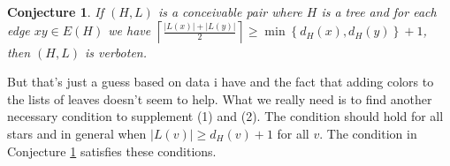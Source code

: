 \documentclass[12pt]{amsart}
\theoremstyle{plain}
\newtheorem{conj}[thm]{Conjecture}
\theoremstyle{definition}
\theoremstyle{remark}
\newcommand{\set}[1]{\left\{ #1 \right\}}
\newcommand{\ceil}[1]{\left\lceil#1\right\rceil}
\begin{document}
\begin{conj}\label{TreeConjecture}
If $(H, L)$ is a conceivable pair where $H$ is a tree and for each edge $xy \in E(H)$ we have $\ceil{\frac{|L(x)| + |L(y)|}{2}} \ge \min\set{d_H(x), d_H(y)} + 1$, then $(H, L)$ is verboten.
\end{conj}

But that's just a guess based on data i have and the fact that adding colors to the lists of leaves doesn't seem to help.  What we really need is to find another necessary condition to supplement (1) and (2).  The condition should hold for all stars and in general when $|L(v)| \ge d_H(v) + 1$ for all $v$.  The condition in Conjecture \ref{TreeConjecture} satisfies these conditions.


\end{document}

